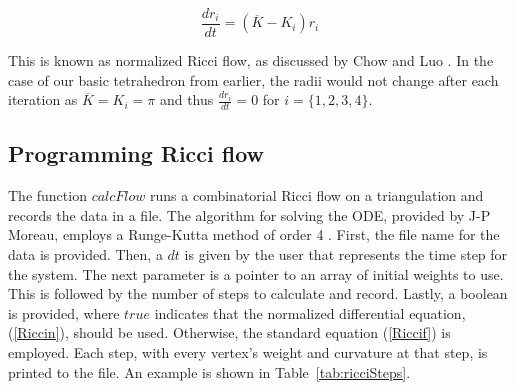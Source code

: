 \documentclass[12pt]{article}
\begin{document}
\begin{equation}
\label{Riccin}
\frac{dr_i}{dt} = (\overline{K} - K_i)r_i
\end{equation}

 This is known as normalized Ricci flow, as discussed by Chow and Luo \cite{chowluo}. In the case of our basic tetrahedron from earlier, the radii would not change after each iteration as $\overline{K} = K_i = \pi$ and thus $\displaystyle\frac{dr_i}{dt} = 0$ for $i = \{1,2,3,4\}$. 

\subsection{Programming Ricci flow}

 The function $calcFlow$ runs a combinatorial Ricci flow on a triangulation and records the data in a file. The algorithm for solving the ODE, provided by J-P Moreau, employs a Runge-Kutta method of order 4 \cite{JPM}. First, the file name for the data is provided. Then, a $dt$ is given by the user that represents the time step for the system. The next parameter is a pointer to an array of initial weights to use. This is followed by the number of steps to calculate and record. Lastly, a boolean is provided, where $true$ indicates that the normalized differential equation, (\ref{Riccin}), should be used. Otherwise, the standard equation (\ref{Riccif}) is employed. Each step, with every vertex's weight and curvature at that step, is printed to the file. An example is shown in Table~\ref{tab:ricciSteps}.
\end{document}
